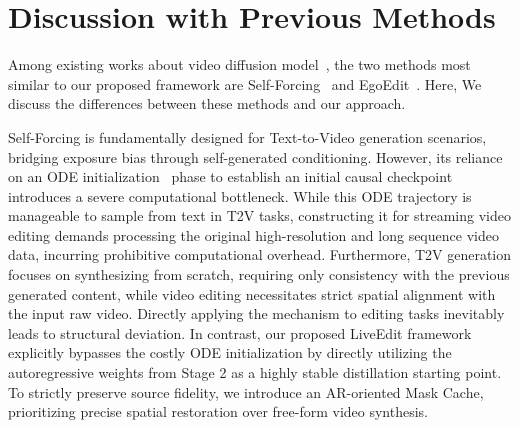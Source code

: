 



\clearpage
\setcounter{page}{1}
\maketitlesupplementary



\tableofcontents
\setcounter{page}{1}
\renewcommand{\thepage}{S\arabic{page}}
\setcounter{section}{0}
\setcounter{figure}{0}
\setcounter{table}{0}

\appendix


\section{Discussion with Previous Methods}

Among existing works about video diffusion model~\cite{ma2025followfaster, ma2024followyouremoji, song2026vista, song2026streamingeffect, gao2026pai, song2024processpainter, Deng_2026_CVPR, deng2024compact, wu2025freeswim, wu2026vibe, liang2026spongebob, liang2026cot, xu2026smrabooth}, the two methods most similar to our proposed framework are Self-Forcing~\cite{huang2025self} and EgoEdit~\cite{li2025egoedit}. Here, We discuss the differences between these methods and our approach.

Self-Forcing is fundamentally designed for Text-to-Video generation scenarios, bridging exposure bias through self-generated conditioning. However, its reliance on an ODE initialization~\cite{yin2025slow, zhu2026causal} phase to establish an initial causal checkpoint introduces a severe computational bottleneck. While this ODE trajectory is manageable to sample from text in T2V tasks, constructing it for streaming video editing demands processing the original high-resolution and long sequence video data, incurring prohibitive computational overhead. Furthermore, T2V generation focuses on synthesizing from scratch, requiring only consistency with the previous generated content, while video editing necessitates strict spatial alignment with the input raw video. Directly applying the mechanism to editing tasks inevitably leads to structural deviation. In contrast, our proposed LiveEdit framework explicitly bypasses the costly ODE initialization by directly utilizing the autoregressive weights from Stage 2 as a highly stable distillation starting point. To strictly preserve source fidelity, we introduce an AR-oriented Mask Cache, prioritizing precise spatial restoration over free-form video synthesis.


